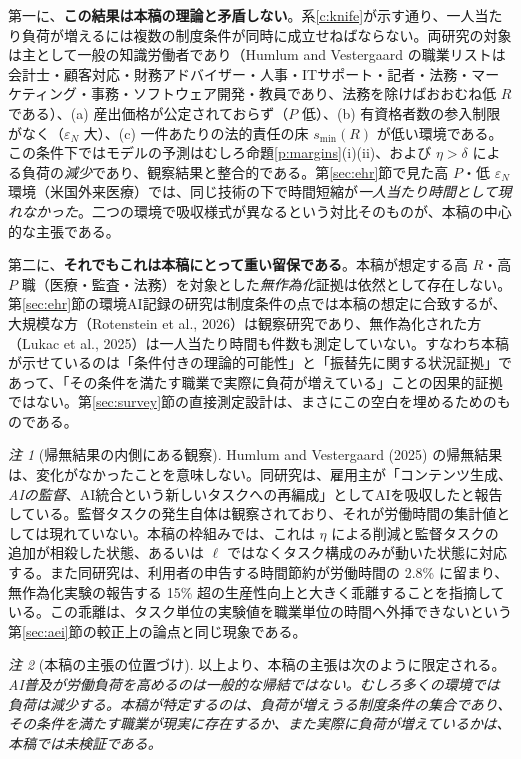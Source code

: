 \documentclass[11pt]{article}
\theoremstyle{plain}
\theoremstyle{definition}
\theoremstyle{remark}
\newtheorem*{rmk}{注}
\begin{document}
第一に、\textbf{この結果は本稿の理論と矛盾しない}。系\ref{c:knife}が示す通り、一人当たり負荷が増えるには複数の制度条件が同時に成立せねばならない。両研究の対象は主として一般の知識労働者であり（Humlum and Vestergaard の職業リストは会計士・顧客対応・財務アドバイザー・人事・ITサポート・記者・法務・マーケティング・事務・ソフトウェア開発・教員であり、法務を除けばおおむね低 $R$ である）、(a) 産出価格が公定されておらず（$P$ 低）、(b) 有資格者数の参入制限がなく（$\varepsilon_N$ 大）、(c) 一件あたりの法的責任の床 $s_{\min}(R)$ が低い環境である。この条件下ではモデルの予測はむしろ命題\ref{p:margins}(i)(ii)、および $\eta>\delta$ による負荷の\emph{減少}であり、観察結果と整合的である。第\ref{sec:ehr}節で見た高 $P$・低 $\varepsilon_N$ 環境（米国外来医療）では、同じ技術の下で時間短縮が\emph{一人当たり時間として現れなかった}。二つの環境で吸収様式が異なるという対比そのものが、本稿の中心的な主張である。

第二に、\textbf{それでもこれは本稿にとって重い留保である}。本稿が想定する高 $R$・高 $P$ 職（医療・監査・法務）を対象とした\emph{無作為化}証拠は依然として存在しない。第\ref{sec:ehr}節の環境AI記録の研究は制度条件の点では本稿の想定に合致するが、大規模な方（Rotenstein et al., 2026）は観察研究であり、無作為化された方（Lukac et al., 2025）は一人当たり時間も件数も測定していない。すなわち本稿が示せているのは「条件付きの理論的可能性」と「振替先に関する状況証拠」であって、「その条件を満たす職業で実際に負荷が増えている」ことの因果的証拠ではない。第\ref{sec:survey}節の直接測定設計は、まさにこの空白を埋めるためのものである。

\begin{rmk}[帰無結果の内側にある観察]
Humlum and Vestergaard (2025) の帰無結果は、変化がなかったことを意味しない。同研究は、雇用主が「コンテンツ生成、\emph{AIの監督}、AI統合という新しいタスクへの再編成」としてAIを吸収したと報告している。監督タスクの発生自体は観察されており、それが労働時間の集計値としては現れていない。本稿の枠組みでは、これは $\eta$ による削減と監督タスクの追加が相殺した状態、あるいは $\ell$ ではなくタスク構成のみが動いた状態に対応する。また同研究は、利用者の申告する時間節約が労働時間の 2.8\% に留まり、無作為化実験の報告する 15\% 超の生産性向上と大きく乖離することを指摘している。この乖離は、タスク単位の実験値を職業単位の時間へ外挿できないという第\ref{sec:aei}節の較正上の論点と同じ現象である。
\end{rmk}

\begin{rmk}[本稿の主張の位置づけ]
以上より、本稿の主張は次のように限定される。\emph{AI普及が労働負荷を高めるのは一般的な帰結ではない。むしろ多くの環境では負荷は減少する。本稿が特定するのは、負荷が増えうる制度条件の集合であり、その条件を満たす職業が現実に存在するか、また実際に負荷が増えているかは、本稿では未検証である。}
\end{rmk}
\end{document}
